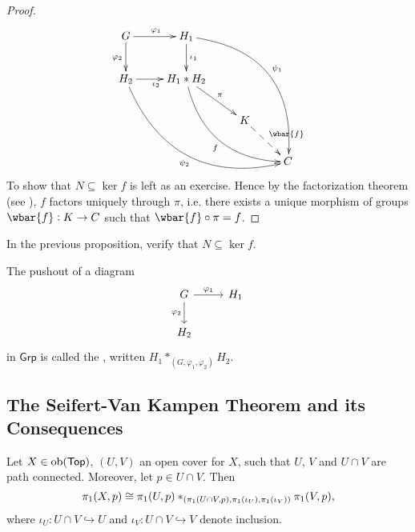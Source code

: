 \begin{proof}
\begin{equation*}
		\xymatrix{
			G \ar[r]^{\varphi_1}\ar[d]_{\varphi_2} & H_1 \ar[d]^{\iota_1}\ar@/^3pc/[dddrr]^{\psi_1}\\
			H_2 \ar[r]_{\iota_2} \ar@/_3pc/[ddrrr]_{\psi_2} & H_1 \ast H_2 \ar[dr]^\pi\ar@/_2pc/[ddrr]_f\\
			& & K \ar@{-->}[dr]^{\wbar{f}}\\
			& & & C
		}
	\end{equation*}
	To show that $N \subseteq \ker f$ is left as an exercise. Hence by the factorization theorem (see \cite[23]{grillet:abstract_algebra:2007}), $f$ factors uniquely through $\pi$, i.e. there exists a unique morphism of groups $\wbar{f} : K \to C$ such that $\wbar{f} \circ \pi = f$.
\end{proof}

\begin{exercise}
	In the previous proposition, verify that $N \subseteq \ker f$.
\end{exercise}

\begin{definition}
The pushout of a diagram
\begin{equation*}
	\begin{tikzcd}
		G \arrow[r,"\varphi_1"]\arrow[d,"\varphi_2"'] & H_1\\
		H_2
	\end{tikzcd}
\end{equation*}
\noindent in $\mathsf{Grp}$ is called the , written $H_1 \ast_{(G,\varphi_1,\varphi_2)} H_2$.
\end{definition}

\subsection*{The Seifert-Van Kampen Theorem and its Consequences}

\begin{theorem}
	Let $X \in \operatorname{ob}(\mathsf{Top})$, $(U,V)$ an open cover for $X$, such that $U$, $V$ and $U \cap V$ are path connected. Moreover, let $p \in U \cap V$. Then
	\begin{equation}
		\pi_1(X,p) \cong \pi_1(U,p) \ast_{\del[0]{\pi_1(U \cap V,p),\pi_1(\iota_U),\pi_1(\iota_V)}} \pi_1(V,p),
	\end{equation}
	\noindent where $\iota_U : U \cap V \hookrightarrow U$ and $\iota_V : U \cap V \hookrightarrow V$ denote inclusion.
	\label{thm:seifert-van_kampen}
\end{theorem}

